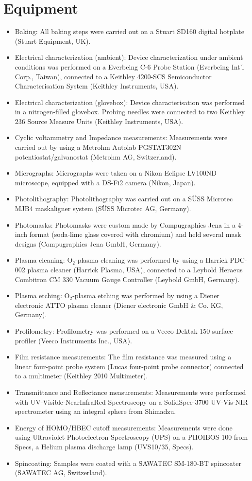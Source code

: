 \section{Equipment}
\begin{itemize}
\item Baking: All baking steps were carried out on a Stuart SD160 digital hotplate (Stuart Equipment, UK). 
\item Electrical characterization (ambient): Device characterization under ambient conditions was performed on a Everbeing C-6 Probe Station (Everbeing Int’l Corp., Taiwan), connected to a Keithley 4200-SCS Semiconductor Characterisation System (Keithley Instruments, USA). 
\item Electrical characterization (glovebox): Device characterisation was performed in a nitrogen-filled glovebox. Probing needles were connected to two Keithley 236 Source Measure Units (Keithley Instruments, USA). 
\item Cyclic voltammetry and Impedance measurements: Measurements were carried out by using a Metrohm Autolab PGSTAT302N potentiostat/galvanostat (Metrohm AG, Switzerland).
\item Micrographs: Micrographs were taken on a Nikon Eclipse LV100ND microscope, equipped with a DS-Fi2 camera (Nikon, Japan). 
\item Photolithography: Photolithography was carried out on a SÜSS Microtec MJB4 maskaligner system (SÜSS Microtec AG, Germany). 
\item Photomasks: Photomasks were custom made by Compugraphics Jena in a 4-inch format (soda-lime glass covered with chromium) and held several mask designs (Compugraphics Jena GmbH, Germany). 
\item Plasma cleaning: O$_{2}$-plasma cleaning was performed by using a Harrick PDC-002 plasma cleaner (Harrick Plasma, USA), connected to a Leybold Heraeus Combitron CM 330 Vacuum Gauge Controller (Leybold GmbH, Germany). 
\item Plasma etching: O$_{2}$-plasma etching was performed by using a Diener electronic ATTO plasma cleaner (Diener electronic GmbH \& Co. KG, Germany). 
\item Profilometry: Profilometry was performed on a Veeco Dektak 150 surface profiler (Veeco Instruments Inc., USA).
\item Film resistance measurements: The film resistance was measured using a linear four-point probe system (Lucas four-point probe connector) connected to a multimeter (Keithley 2010 Multimeter).
\item Transmittance and Reflectance measurements: Measurements were performed with UV-Visible-NearInfraRed Spectroscopy on a SolidSpec-3700 UV-Vis-NIR spectrometer using an integral sphere from Shimadzu.
\item Energy of HOMO/HBEC cutoff measurements: Measurements were done using Ultraviolet Photoelectron Spectroscopy (UPS) on a PHOIBOS 100 from Specs, a Helium plasma discharge lamp (UVS10/35, Specs).
\item Spincoating: Samples were coated with a SAWATEC SM-180-BT spincoater (SAWATEC AG, Switzerland).
\end{itemize}

